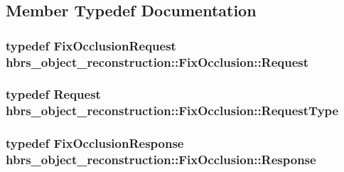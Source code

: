 \subsection{\-Member \-Typedef \-Documentation}
\hypertarget{structhbrs__object__reconstruction_1_1_fix_occlusion_ad84cf29b5ac08d5c38b9bff6021d8280}{
\subsubsection[{\-Request}]{\setlength{\rightskip}{0pt plus 5cm}typedef {\bf \-Fix\-Occlusion\-Request} {\bf hbrs\-\_\-object\-\_\-reconstruction\-::\-Fix\-Occlusion\-::\-Request}}}\label{structhbrs__object__reconstruction_1_1_fix_occlusion_ad84cf29b5ac08d5c38b9bff6021d8280}
\hypertarget{structhbrs__object__reconstruction_1_1_fix_occlusion_a81b9e631834e62676196c5861be0d018}{
\subsubsection[{\-Request\-Type}]{\setlength{\rightskip}{0pt plus 5cm}typedef {\bf \-Request} {\bf hbrs\-\_\-object\-\_\-reconstruction\-::\-Fix\-Occlusion\-::\-Request\-Type}}}\label{structhbrs__object__reconstruction_1_1_fix_occlusion_a81b9e631834e62676196c5861be0d018}
\hypertarget{structhbrs__object__reconstruction_1_1_fix_occlusion_a8f008499ed365ef31d51c0680d25a427}{
\subsubsection[{\-Response}]{\setlength{\rightskip}{0pt plus 5cm}typedef {\bf \-Fix\-Occlusion\-Response} {\bf hbrs\-\_\-object\-\_\-reconstruction\-::\-Fix\-Occlusion\-::\-Response}}}\label{structhbrs__object__reconstruction_1_1_fix_occlusion_a8f008499ed365ef31d51c0680d25a427}
